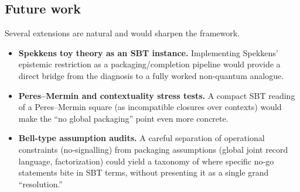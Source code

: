 \subsection{Future work}

Several extensions are natural and would sharpen the framework.

\begin{itemize}
  \item \textbf{Spekkens toy theory as an SBT instance.} Implementing Spekkens' epistemic restriction as a packaging/completion pipeline would provide a direct bridge from the diagnosis to a fully worked non-quantum analogue.
  \item \textbf{Peres--Mermin and contextuality stress tests.} A compact SBT reading of a Peres--Mermin square (as incompatible closures over contexts) would make the ``no global packaging'' point even more concrete.\cite{Mermin1990}
  \item \textbf{Bell-type assumption audits.} A careful separation of operational constraints (no-signalling) from packaging assumptions (global joint record language, factorization) could yield a taxonomy of where specific no-go statements bite in SBT terms, without presenting it as a single grand ``resolution.''
\end{itemize}
